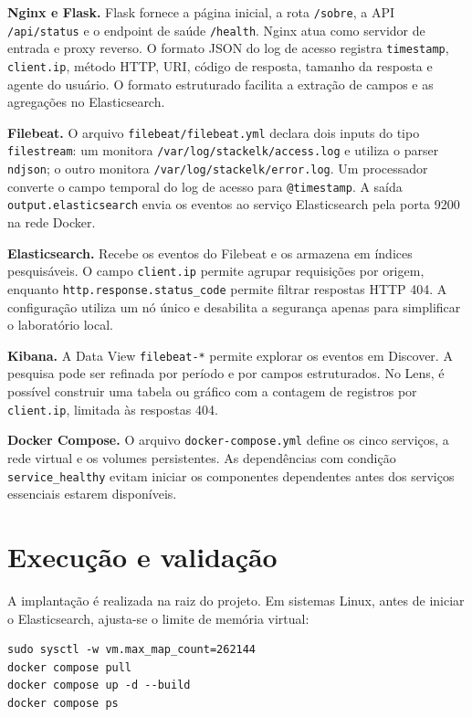 \documentclass[10pt,a4paper]{article}
\begin{document}
\textbf{Nginx e Flask.} Flask fornece a página inicial, a rota \texttt{/sobre}, a API \texttt{/api/status} e o endpoint de saúde \texttt{/health}. Nginx atua como servidor de entrada e proxy reverso. O formato JSON do log de acesso registra \texttt{timestamp}, \texttt{client.ip}, método HTTP, URI, código de resposta, tamanho da resposta e agente do usuário. O formato estruturado facilita a extração de campos e as agregações no Elasticsearch.

\textbf{Filebeat.} O arquivo \texttt{filebeat/filebeat.yml} declara dois inputs do tipo \texttt{filestream}: um monitora \texttt{/var/log/stackelk/access.log} e utiliza o parser \texttt{ndjson}; o outro monitora \texttt{/var/log/stackelk/error.log}. Um processador converte o campo temporal do log de acesso para \texttt{@timestamp}. A saída \texttt{output.elasticsearch} envia os eventos ao serviço Elasticsearch pela porta 9200 na rede Docker.

\textbf{Elasticsearch.} Recebe os eventos do Filebeat e os armazena em índices pesquisáveis. O campo \texttt{client.ip} permite agrupar requisições por origem, enquanto \texttt{http.response.status\_code} permite filtrar respostas HTTP 404. A configuração utiliza um nó único e desabilita a segurança apenas para simplificar o laboratório local.

\textbf{Kibana.} A Data View \texttt{filebeat-*} permite explorar os eventos em Discover. A pesquisa pode ser refinada por período e por campos estruturados. No Lens, é possível construir uma tabela ou gráfico com a contagem de registros por \texttt{client.ip}, limitada às respostas 404.

\textbf{Docker Compose.} O arquivo \texttt{docker-compose.yml} define os cinco serviços, a rede virtual e os volumes persistentes. As dependências com condição \texttt{service\_healthy} evitam iniciar os componentes dependentes antes dos serviços essenciais estarem disponíveis.

\section{Execução e validação}

A implantação é realizada na raiz do projeto. Em sistemas Linux, antes de iniciar o Elasticsearch, ajusta-se o limite de memória virtual:

\begin{lstlisting}
sudo sysctl -w vm.max_map_count=262144
docker compose pull
docker compose up -d --build
docker compose ps
\end{lstlisting}
\end{document}
